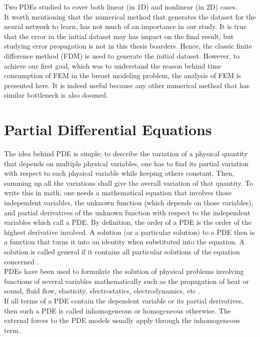 Two PDEs studied to cover both linear (in 1D) and nonlinear (in 2D) cases.\\
It worth mentioning that the numerical method that generates the dataset for the neural network to learn, has not much of an importance in our study. It is true that the error in the initial dataset may has impact on the final result, but studying error propagation is not in this thesis boarders. Hence, the classic finite difference method (FDM) is used to generate the initial dataset. However, to achieve our first goal, which was to understand the reason behind time consumption of FEM in the breast modeling problem, the analysis of FEM is presented here. It is indeed useful because any other numerical method that has similar bottleneck is also doomed.
\section{Partial Differential Equations}
\label{sec:PDE}
The idea behind PDE is simple; to describe the variation of a physical quantity that depends on multiple physical variables, one has to find its partial variation with respect to each physical variable while keeping others constant. Then, summing up all the variations shall give the overall variation of that quantity. To write this in math, one needs a mathematical equation that involves those independent variables, the unknown function (which depends on those variables), and partial derivatives of the unknown function with respect to the independent variables which call a PDE. By definition, the order of a PDE is the order of the highest derivative involved. A solution (or a particular solution) to a PDE then is a function that turns it into an identity when substituted into the equation. A solution is called general if it contains all particular solutions of the equation concerned \cite{stavroulakis1999partial}.\\
PDEs have been used  to formulate the solution of physical problems involving functions of several variables mathematically such as the propagation of heat or sound, fluid flow, elasticity, electrostatics, electrodynamics, etc \cite{stavroulakis1999partial}.\\
If all terms of a PDE contain the dependent variable or its partial derivatives, then such a PDE is called inhomogeneous or homogeneous otherwise. The external forces to the PDE models usually apply through the inhomogeneous term.\\
